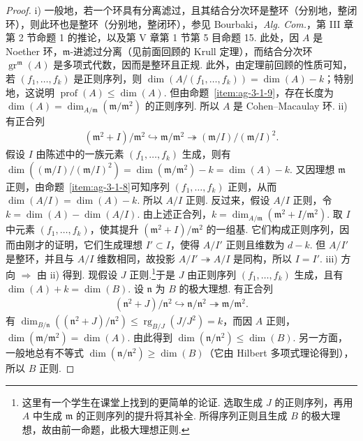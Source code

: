 \begin{proof}
\textup{i)} 一般地，若一个环具有分离滤过，且其结合分次环是整环（分别地，整闭环），则此环也是整环（分别地，整闭环），参见 Bourbaki，\emph{Alg. Com.}，第 III 章第 2 节命题 1 的推论，以及第 V 章第 1 节第 5 目命题 15. 此处，因 $A$ 是 Noether 环，$\mathfrak m$-进滤过分离（见前面回顾的 Krull 定理），而结合分次环 $\operatorname{gr}^{\mathfrak m}(A)$ 是多项式代数，因而是整环且正规. 此外，由定理前回顾的性质可知，若 $(f_1,\ldots,f_k)$ 是正则序列，则 $\dim(A/(f_1,\ldots,f_k))=\dim(A)-k$；特别地，这说明 $\operatorname{prof}(A)\leqslant\dim(A)$. 但由命题~\ref{item:ag-3-1-9}，存在长度为 $\dim(A)=\dim_{A/\mathfrak m}(\mathfrak m/\mathfrak m^2)$ 的正则序列. 所以 $A$ 是 Cohen--Macaulay 环.
\textup{ii)} 有正合列
\begin{align*}
(\mathfrak m^2+I)/\mathfrak m^2\hookrightarrow\mathfrak m/\mathfrak m^2\twoheadrightarrow(\mathfrak m/I)/(\mathfrak m/I)^2.
\end{align*}
假设 $I$ 由陈述中的一族元素 $(f_1,\ldots,f_k)$ 生成，则有 $\dim((\mathfrak m/I)/(\mathfrak m/I)^2)=\dim(\mathfrak m/\mathfrak m^2)-k=\dim(A)-k$. 又因理想 $\mathfrak m$ 正则，由命题~\ref{item:ag-3-1-8}可知序列 $(f_1,\ldots,f_k)$ 正则，从而 $\dim(A/I)=\dim(A)-k$. 所以 $A/I$ 正则. 反过来，假设 $A/I$ 正则，令 $k=\dim(A)-\dim(A/I)$. 由上述正合列，$k=\dim_{A/\mathfrak m}(\mathfrak m^2+I/\mathfrak m^2)$. 取 $I$ 中元素 $(f_1,\ldots,f_k)$，使其提升 $(\mathfrak m^2+I)/\mathfrak m^2$ 的一组基. 它们构成正则序列，因而由刚才的证明，它们生成理想 $I'\subset I$，使得 $A/I'$ 正则且维数为 $d-k$. 但 $A/I'$ 是整环，并且与 $A/I$ 维数相同，故投影 $A/I'\twoheadrightarrow A/I$ 是同构，所以 $I=I'$.
\textup{iii)} 方向 $\Rightarrow$ 由 ii) 得到. 现假设 $J$ 正则.\footnote{这里有一个学生在课堂上找到的更简单的论证. 选取生成 $J$ 的正则序列，再用 $A$ 中生成 $\mathfrak m$ 的正则序列的提升将其补全. 所得序列正则且生成 $B$ 的极大理想，故由前一命题，此极大理想正则.}于是 $J$ 由正则序列 $(f_1,\ldots,f_k)$ 生成，且有 $\dim(A)+k=\dim(B)$. 设 $\mathfrak n$ 为 $B$ 的极大理想. 有正合列
\begin{align*}
(\mathfrak n^2+J)/\mathfrak n^2\hookrightarrow\mathfrak n/\mathfrak n^2\twoheadrightarrow\mathfrak m/\mathfrak m^2.
\end{align*}
有 $\dim_{B/\mathfrak n}((\mathfrak n^2+J)/\mathfrak n^2)\leqslant\operatorname{rg}_{B/J}(J/J^2)=k$，而因 $A$ 正则，$\dim(\mathfrak m/\mathfrak m^2)=\dim(A)$. 由此得到 $\dim(\mathfrak n/\mathfrak n^2)\leqslant\dim(B)$. 另一方面，一般地总有不等式 $\dim(\mathfrak n/\mathfrak n^2)\geqslant\dim(B)$（它由 Hilbert 多项式理论得到），所以 $B$ 正则.

\end{proof}
